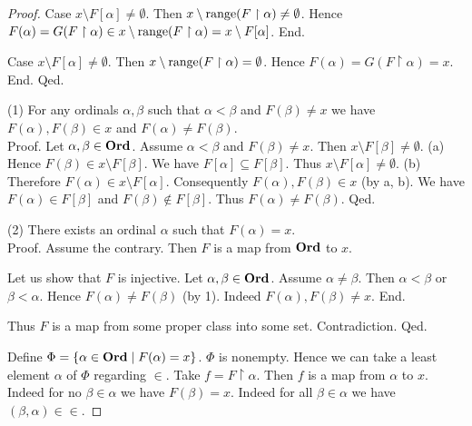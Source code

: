 \documentclass[../set-theory.tex]{subfiles}
\begin{document}
\begin{forthel}
\begin{proof}
        Case $x \setminus F[\alpha] \neq \emptyset$.
          Then $x \setminus \operatorname{range}(F \restriction \alpha) \neq \emptyset$.
          Hence $F(\alpha)
            = G(F \restriction \alpha)
            \in x \setminus \operatorname{range}(F \restriction \alpha)
            = x \setminus F[\alpha]$.
        End.

        Case $x \setminus F[\alpha] \neq \emptyset$.
          Then $x \setminus \operatorname{range}(F \restriction \alpha) = \emptyset$.
          Hence $F(\alpha)
            = G(F \restriction \alpha)
            = x$.
        End.
      Qed.

      (1) For any ordinals $\alpha, \beta$ such that $\alpha < \beta$ and
      $F(\beta) \neq x$ we have $F(\alpha), F(\beta) \in x$ and $F(\alpha) \neq
      F(\beta)$. \\
      Proof.
        Let $\alpha, \beta \in \mathbf{Ord}$.
        Assume $\alpha < \beta$ and $F(\beta) \neq x$.
        Then $x \setminus F[\beta] \neq \emptyset$.
        (a) Hence $F(\beta) \in x \setminus F[\beta]$.
        We have $F[\alpha] \subseteq F[\beta]$.
        Thus $x \setminus F[\alpha] \neq \emptyset$.
        (b) Therefore $F(\alpha) \in x \setminus F[\alpha]$.
        Consequently $F(\alpha), F(\beta) \in x$ (by a, b).
        We have $F(\alpha) \in F[\beta]$ and $F(\beta) \notin F[\beta]$.
        Thus $F(\alpha) \neq F(\beta)$.
      Qed.

      (2) There exists an ordinal $\alpha$ such that $F(\alpha) = x$. \\
      Proof.
        Assume the contrary.
        Then $F$ is a map from $\mathbf{Ord}$ to $x$.

        Let us show that $F$ is injective.
          Let $\alpha, \beta \in \mathbf{Ord}$.
          Assume $\alpha \neq \beta$.
          Then $\alpha < \beta$ or $\beta < \alpha$.
          Hence $F(\alpha) \neq F(\beta)$ (by 1).
          Indeed $F(\alpha), F(\beta) \neq x$.
        End.

        Thus $F$ is a map from some proper class into some set.
        Contradiction.
      Qed.

      Define $\Phi = \{ \alpha \in \mathbf{Ord} \mid F(\alpha) = x \}$.
      $\Phi$ is nonempty.
      Hence we can take a least element $\alpha$ of $\Phi$ regarding ${\in}$.
      Take $f = F \restriction \alpha$.
      Then $f$ is a map from $\alpha$ to $x$.
      Indeed for no $\beta \in \alpha$ we have $F(\beta) = x$.
      Indeed for all $\beta \in \alpha$ we have $(\beta, \alpha) \in {\in}$.


\end{proof}
\end{forthel}
\end{document}
